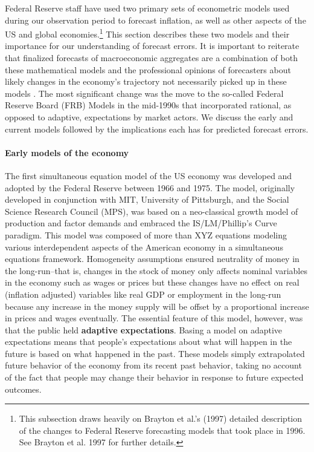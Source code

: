 \documentclass[a4paper]{article}\usepackage{graphicx, color}
\begin{document}
Federal Reserve staff have used two primary sets of econometric models used during our observation period to forecast inflation, as well as other aspects of the US and global economies.\footnote{This subsection draws heavily on Brayton et al.'s\nocite{Brayton1997} (1997) detailed description of the changes to Federal Reserve forecasting models that took place in 1996. See Brayton et al. 1997 for further details.} This section describes these two models and their importance for our understanding of forecast errors. It is important to reiterate that finalized forecasts of macroeconomic aggregates are a combination of both these mathematical models and the professional opinions of forecasters about likely changes in the economy's trajectory not necessarily picked up in these models \citep{Karamouzis1989,Reifschneider1997,Taylor1997}. The most significant change was the move to the so-called Federal Reserve Board (FRB) Models in the mid-1990s that incorporated rational, as opposed to adaptive, expectations by market actors. We discuss the early and current models followed by the implications each has for predicted forecast errors.

\paragraph{Early models of the economy}
The first simultaneous equation model of the US economy was developed and adopted by the Federal Reserve between 1966 and 1975. The model, originally developed in conjunction with MIT, University of Pittsburgh, and the Social Science Research Council (MPS), was based on a neo-classical growth model of production and factor demands and embraced the IS/LM/Phillip's Curve paradigm. This model was composed of more than XYZ equations modeling various interdependent aspects of the American economy in a simultaneous equations framework. Homogeneity assumptions ensured neutrality of money in the long-run--that is, changes in the stock of money only affects nominal variables in the economy such as wages or prices but these changes have no effect on real (inflation adjusted) variables like real GDP or employment in the long-run because any increase in the money supply will be offset by a proportional increase in prices and wages eventually. The essential feature of this model, however, was that the public held {\bf{adaptive expectations}}. Basing a model on adaptive expectations means that people's expectations about what will happen in the future is based on what happened in the past. These models simply extrapolated future behavior of the economy from its recent past behavior, taking no account of the fact that people may change their behavior in response to future expected outcomes.
\end{document}
